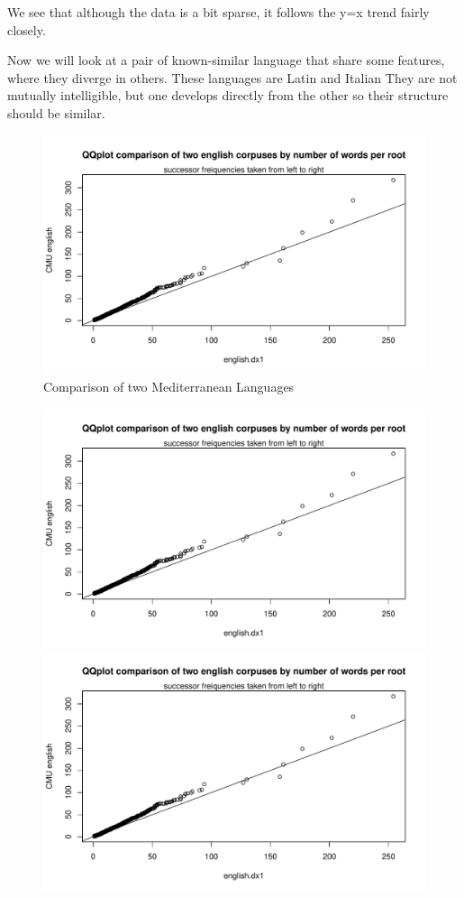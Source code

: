 \documentclass{article}
\begin{document}
We see that although the data is a bit sparse, it follows the y=x trend fairly closely. 


Now we will look at a pair of known-similar language that share some features, where they diverge in others. These languages are Latin and Italian They are not mutually intelligible, but one develops directly from the other so their structure should be similar. 

		\begin{figure}[H]
		\centering
		\caption{Comparison of two Mediterranean Languages}
		\includegraphics[scale=.7,page=4]{plots.pdf}
		\end{figure}
		\begin{figure}[H]
		\centering
		\includegraphics[scale=.7,page=5]{plots.pdf}
		\includegraphics[scale=.7,page=6]{plots.pdf}
		\end{figure}
\end{document}
